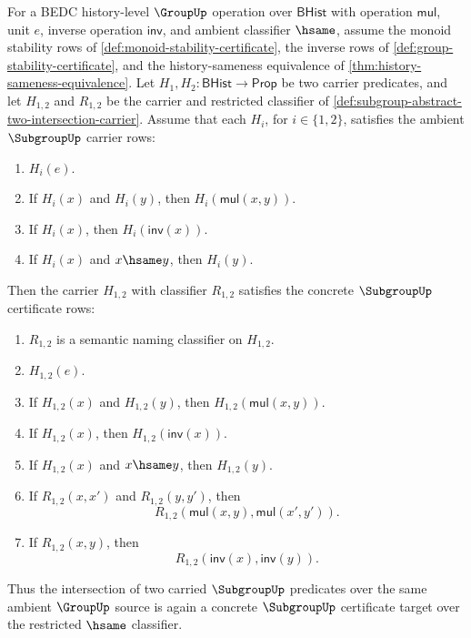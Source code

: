 \begin{theorem}
\label{thm:subgroup-abstract-two-intersection-certificate}
For a BEDC history-level $\GroupUp$ operation over $\mathsf{BHist}$ with operation $\mathsf{mul}$, unit $e$, inverse operation $\mathsf{inv}$, and ambient classifier $\hsame$, assume the monoid stability rows of \autoref{def:monoid-stability-certificate}, the inverse rows of \autoref{def:group-stability-certificate}, and the history-sameness equivalence of \autoref{thm:history-sameness-equivalence}. Let $H_1,H_2:\mathsf{BHist}\to\mathsf{Prop}$ be two carrier predicates, and let $H_{1,2}$ and $R_{1,2}$ be the carrier and restricted classifier of \autoref{def:subgroup-abstract-two-intersection-carrier}. Assume that each $H_i$, for $i\in\{1,2\}$, satisfies the ambient $\SubgroupUp$ carrier rows:
\begin{enumerate}
\item $H_i(e)$.
\item If $H_i(x)$ and $H_i(y)$, then $H_i(\mathsf{mul}(x,y))$.
\item If $H_i(x)$, then $H_i(\mathsf{inv}(x))$.
\item If $H_i(x)$ and $x\hsame y$, then $H_i(y)$.
\end{enumerate}
Then the carrier $H_{1,2}$ with classifier $R_{1,2}$ satisfies the concrete $\SubgroupUp$ certificate rows:
\begin{enumerate}
\item $R_{1,2}$ is a semantic naming classifier on $H_{1,2}$.
\item $H_{1,2}(e)$.
\item If $H_{1,2}(x)$ and $H_{1,2}(y)$, then $H_{1,2}(\mathsf{mul}(x,y))$.
\item If $H_{1,2}(x)$, then $H_{1,2}(\mathsf{inv}(x))$.
\item If $H_{1,2}(x)$ and $x\hsame y$, then $H_{1,2}(y)$.
\item If $R_{1,2}(x,x')$ and $R_{1,2}(y,y')$, then
$$
R_{1,2}(\mathsf{mul}(x,y),\mathsf{mul}(x',y')).
$$
\item If $R_{1,2}(x,y)$, then
$$
R_{1,2}(\mathsf{inv}(x),\mathsf{inv}(y)).
$$
\end{enumerate}
Thus the intersection of two carried $\SubgroupUp$ predicates over the same ambient $\GroupUp$ source is again a concrete $\SubgroupUp$ certificate target over the restricted $\hsame$ classifier.
\end{theorem}
